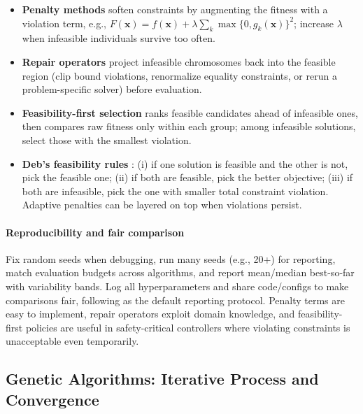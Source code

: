 \begin{tcolorbox}[summarybox, title={Constraint handling playbook}]
\begin{itemize}
    \item \textbf{Penalty methods} soften constraints by augmenting the fitness with a violation term, e.g., \(F(\mathbf{x}) = f(\mathbf{x})+\lambda \sum_k \max\{0, g_k(\mathbf{x})\}^2\); increase \(\lambda\) when infeasible individuals survive too often.
    \item \textbf{Repair operators} project infeasible chromosomes back into the feasible region (clip bound violations, renormalize equality constraints, or rerun a problem-specific solver) before evaluation.
    \item \textbf{Feasibility-first selection} ranks feasible candidates ahead of infeasible ones, then compares raw fitness only within each group; among infeasible solutions, select those with the smallest violation.
    \item \textbf{Deb's feasibility rules} \citep{Deb2001Book}: (i) if one solution is feasible and the other is not, pick the feasible one; (ii) if both are feasible, pick the better objective; (iii) if both are infeasible, pick the one with smaller total constraint violation. Adaptive penalties can be layered on top when violations persist.
\end{itemize}
\paragraph{Reproducibility and fair comparison} Fix random seeds when debugging, run many seeds (e.g., 20+) for reporting, match evaluation budgets across algorithms, and report mean/median best-so-far with variability bands. Log all hyperparameters and share code/configs to make comparisons fair, following  as the default reporting protocol.
Penalty terms are easy to implement, repair operators exploit domain knowledge, and feasibility-first policies are useful in safety-critical controllers where violating constraints is unacceptable even temporarily.
\end{tcolorbox}


\subsection{Genetic Algorithms: Iterative Process and Convergence}
\label{sec:evo_genetic_algorithms_iterative_process_and_convergence}

